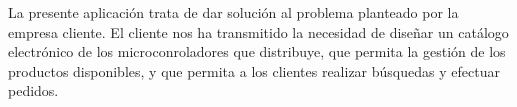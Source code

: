 La presente aplicación trata de dar solución al problema planteado por la empresa cliente.
El cliente nos ha transmitido la necesidad de diseñar un catálogo electrónico de los microconroladores que distribuye, que permita la gestión de los productos disponibles, y que permita a los clientes realizar búsquedas y efectuar pedidos.